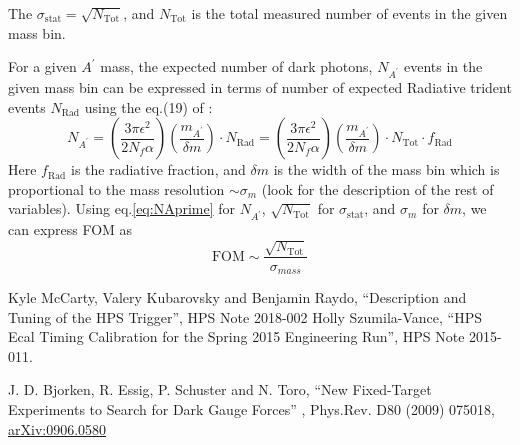 \documentclass[letterpaper,12pt]{article}
\def \dstl {\displaystyle}
\begin{document}
The $\sigma_{\mathrm{stat}} = \sqrt{N_{\mathrm{Tot}}}$, and $N_{\mathrm{Tot}}$ is the total measured number of events in the given mass bin.

For a given $A^{\prime}$ mass, the expected number of dark photons, 
$\dstl N_{A^{\prime}}$ events in the given mass bin  can be expressed in terms of number of expected Radiative trident events $N_{\mathrm{Rad}}$ using the eq.(19) of \cite{AprimeFixedTargetTheory}:
\begin{equation}
 N_{A^{\prime}} = \left(\frac{\dstl 3\pi \epsilon^{2}}{\dstl 2 N_{f} \alpha}\right) \left( \frac{\dstl m_{A^{\prime}}}{\delta m} \right)\cdot N_{\mathrm{Rad}} = \left(\frac{\dstl 3\pi \epsilon^{2}}{\dstl 2 N_{f} \alpha}\right) \left( \frac{\dstl m_{A^{\prime}}}{\delta m} \right) \cdot N_{\mathrm{Tot}}\cdot f_{\mathrm{Rad}}
 \label{eq:NAprime}
\end{equation}
Here $f_{\mathrm{Rad}}$ is the radiative fraction, and $\delta m$ is the width of the mass bin which is proportional to the mass resolution $\sim \sigma_{m}$ (look \cite{AprimeFixedTargetTheory} for the description of the rest of variables). 
Using eq.\ref{eq:NAprime} for $N_{A^{\prime}}$, $\dstl\sqrt{N_{\mathrm{Tot}}}$ for 
$\sigma_{\mathrm{stat}}$, and $\dstl \sigma_{m}$ for $\delta m$, we can express FOM as
\begin{equation}
 \mathrm {FOM} \sim \frac{\dstl \sqrt{N_{\mathrm{Tot}}}}{\sigma_{mass}}
\end{equation}


\begin{thebibliography}{55}
  Kyle McCarty, Valery Kubarovsky and Benjamin Raydo, ``Description and Tuning of the HPS Trigger'', HPS Note 2018-002
  Holly Szumila-Vance, ``HPS Ecal Timing Calibration for the
Spring 2015 Engineering Run'', HPS Note 2015-011.

 J. D. Bjorken, R. Essig, P. Schuster and N. Toro, ``New Fixed-Target Experiments to Search for Dark Gauge Forces'' , Phys.Rev. D80 (2009) 075018, \href{https://arxiv.org/abs/0906.0580}{arXiv:0906.0580}
\end{thebibliography}
\end{document}
